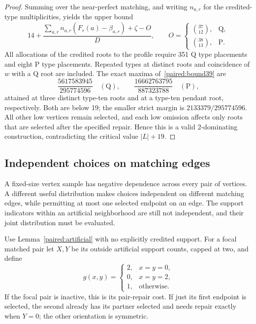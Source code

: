 \documentclass[11pt,a4paper]{article}
\theoremstyle{definition}\newtheorem{definition}[theorem]{Definition}
\theoremstyle{remark}\newtheorem{remark}[theorem]{Remark}
\begin{document}
\begin{proof}
Summing over the near-perfect matching, and writing $n_{a,r}$ for
the credited-type multiplicities, yields the upper bound
\begin{equation}\label{paired:bound39}
 14+\frac{\sum_{a,r}n_{a,r}(F_r(a)-\beta_{a,r})+\zeta-O}{D},
 \qquad O=\begin{cases}\binom{37}{12},&\mathrm Q,\\
                         \binom{38}{13},&\mathrm P.
          \end{cases}
\end{equation}
All allocations of the credited roots to the profile require 351 Q
type placements and eight P type placements. Repeated types at
distinct roots and coincidence of $w$ with a Q root are included.
The exact maxima of~\eqref{paired:bound39} are
\[
 \frac{5617583945}{295774596}\quad(\mathrm Q),\qquad
 \frac{16662763795}{887323788}\quad(\mathrm P),
\]
attained at three distinct type-ten roots and at a type-ten pendant
root, respectively. Both are below 19; the smaller strict margin is
$2133379/295774596$. All other low vertices remain selected, and
each low omission affects only roots that are selected after the
specified repair. Hence this is a valid 2-dominating construction,
contradicting the critical value $|L|+19$.
\end{proof}

\subsection{Independent choices on matching edges}
\label{paired:independent-matching-section}

A fixed-size vertex sample has negative dependence across every pair
of vertices. A different useful distribution makes choices independent
on different matching edges, while permitting at most one selected
endpoint on an edge. The support indicators within an artificial
neighborhood are still not independent, and their joint distribution
must be evaluated.

Use Lemma~\ref{paired:artificial} with no explicitly credited support.
For a focal matched pair let $X,Y$ be its outside artificial support
counts, capped at two, and define
\begin{equation}\label{paired:gpair}
 g(x,y)=\begin{cases}2,&x=y=0,\\0,&x=y=2,\\1,&\text{otherwise}.
 \end{cases}
\end{equation}
If the focal pair is inactive, this is its pair-repair cost. If just
its first endpoint is selected, the second already has its partner
selected and needs repair exactly when $Y=0$; the other orientation
is symmetric.
\end{document}
